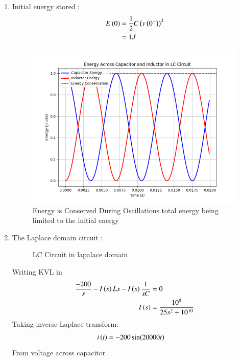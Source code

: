 \documentclass[journal,12pt,twocolumn]{IEEEtran}
\theoremstyle{remark}
\begin{document}
\begin{enumerate}[label=\textbf{(\alph*)}]
    \item Initial energy stored :
    \begin{align}
        E\left(0\right)&= \frac{1}{2}C\left(v\left(0^-\right)\right)^2\\
            &=  1 J 
    \end{align}
\begin{figure}[H]
    \includegraphics[width=1\columnwidth]{figs/Plot_energy.png}
    \caption{Energy is Conserved During Oscillations total energy being limited to the initial energy}
    \label{fig:energy_plots}
\end{figure}
 \item 
The Laplace domain circuit :
\begin{figure}[H]
    \centering
    \resizebox{0.4\textwidth}{!}{}
    \caption{LC Circuit in lapalace domain}
    \label{fig:ncert_12.7.12_cktdiag_lap}
\end{figure}
Writing KVL in 
\begin{align}
    \frac{-200}{s} - I\left(s\right)Ls -I\left(s\right)\frac{1}{sC} &= 0\\
    I\left(s\right) &= \frac{10^8}{25s^2 + 10^{10}}\label{eq:ncert12.7.12_i(s)}
\end{align}
Taking inverse-Laplace transform:
\begin{align}
    i\left(t\right) &= -200\sin(20000t)
\end{align}
From  voltage across capacitor
\begin{align}

\end{align}
\end{enumerate}
\end{document}
